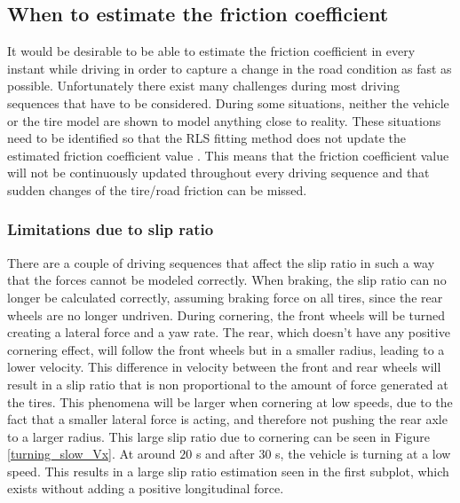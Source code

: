 \subsection{When to estimate the friction coefficient}
\label{when_to_estimate}
It would be desirable to be able to estimate the friction coefficient in every instant while driving in order to capture a change in the road condition as fast as possible. Unfortunately there exist many challenges during most driving sequences that have to be considered. During some situations, neither the vehicle or the tire model are shown to model anything close to reality. These situations need to be identified so that the RLS fitting method does not update the estimated friction coefficient value . This means that the friction coefficient value will not be continuously updated throughout every driving sequence and that sudden changes of the tire/road friction can be missed.

\subsubsection{Limitations due to slip ratio }
There are a couple of driving sequences that affect the slip ratio in such a way that the forces cannot be modeled correctly. When braking, the slip ratio can no longer be calculated correctly, assuming braking force on all tires, since the rear wheels are no longer undriven. During cornering, the front wheels will be turned creating a lateral force and a yaw rate. The rear, which doesn't have any positive cornering effect, will follow the front wheels but in a smaller radius, leading to a lower velocity. This difference in velocity between the front and rear wheels will result in a slip ratio that is non proportional to the amount of force generated at the tires. This phenomena will be larger when cornering at low speeds, due to the fact that a smaller lateral force is acting, and therefore not pushing the rear axle to a larger radius. This large slip ratio due to cornering can be seen in Figure \ref{turning_slow_Vx}. At around $ 20 $ s and after $ 30 $ s, the vehicle is turning at a low speed. This results in a large slip ratio estimation seen in the first subplot, which exists without adding a positive longitudinal force.

